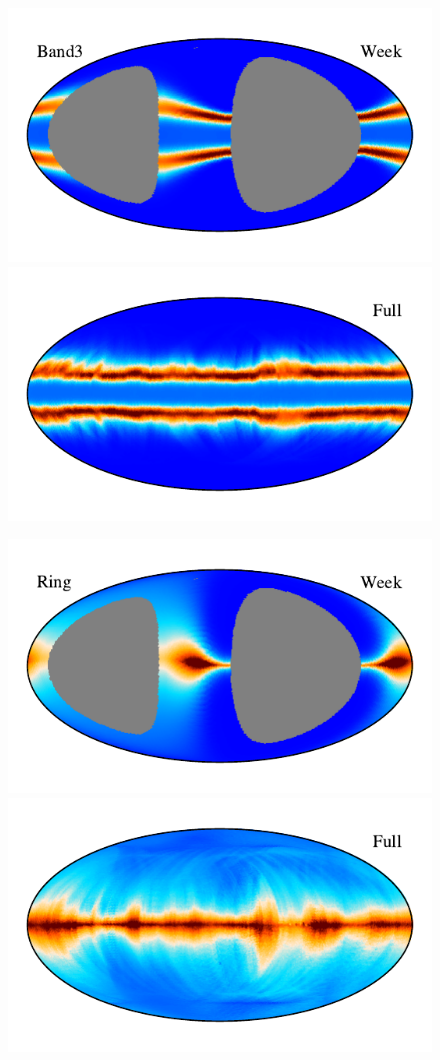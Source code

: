 \documentclass{aa}
\begin{document}
\begin{figure}
    \includegraphics[width=0.9\columnwidth]{figs/zodi_comps/zodi_06_band3_week.pdf}\includegraphics[width=0.9\columnwidth]{figs/zodi_comps/zodi_06_band3_full.pdf}

    \vspace{-0.6cm}

    \includegraphics[width=0.9\columnwidth]{figs/zodi_comps/zodi_06_ring_week.pdf}\includegraphics[width=0.9\columnwidth]{figs/zodi_comps/zodi_06_ring_full.pdf}


\end{figure}
\end{document}
